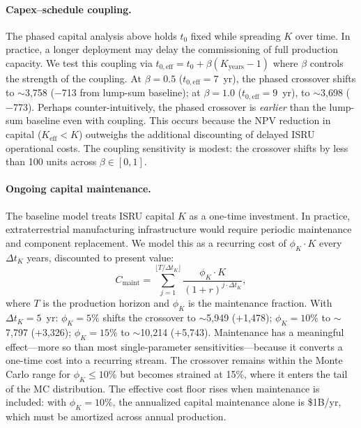 \documentclass[preprint,12pt]{elsarticle}
\begin{document}
\paragraph{Capex--schedule coupling.} The phased capital analysis above holds $t_0$ fixed while spreading $K$ over time. In practice, a longer deployment may delay the commissioning of full production capacity. We test this coupling via $t_{0,\mathrm{eff}} = t_0 + \beta(K_{\mathrm{years}} - 1)$ where $\beta$ controls the strength of the coupling. At $\beta = 0.5$ ($t_{0,\mathrm{eff}} = 7$~yr), the phased crossover shifts to $\sim$3{,}758 ($-$713 from lump-sum baseline); at $\beta = 1.0$ ($t_{0,\mathrm{eff}} = 9$~yr), to $\sim$3{,}698 ($-$773). Perhaps counter-intuitively, the phased crossover is \emph{earlier} than the lump-sum baseline even with coupling. This occurs because the NPV reduction in capital ($K_{\mathrm{eff}} < K$) outweighs the additional discounting of delayed ISRU operational costs. The coupling sensitivity is modest: the crossover shifts by less than 100 units across $\beta \in [0, 1]$.

\paragraph{Ongoing capital maintenance.} The baseline model treats ISRU capital $K$ as a one-time investment. In practice, extraterrestrial manufacturing infrastructure would require periodic maintenance and component replacement. We model this as a recurring cost of $\phi_K \cdot K$ every $\Delta t_K$ years, discounted to present value:
\begin{equation}
  C_{\mathrm{maint}} = \sum_{j=1}^{\lfloor T/\Delta t_K \rfloor} \frac{\phi_K \cdot K}{(1+r)^{j \cdot \Delta t_K}},
\end{equation}
where $T$ is the production horizon and $\phi_K$ is the maintenance fraction. With $\Delta t_K = 5$~yr: $\phi_K = 5\%$ shifts the crossover to $\sim$5{,}949 ($+$1{,}478); $\phi_K = 10\%$ to $\sim$7{,}797 ($+$3{,}326); $\phi_K = 15\%$ to $\sim$10{,}214 ($+$5{,}743). Maintenance has a meaningful effect---more so than most single-parameter sensitivities---because it converts a one-time cost into a recurring stream. The crossover remains within the Monte Carlo range for $\phi_K \leq 10\%$ but becomes strained at 15\%, where it enters the tail of the MC distribution. The effective cost floor rises when maintenance is included: with $\phi_K = 10\%$, the annualized capital maintenance alone is \$1B/yr, which must be amortized across annual production.
\end{document}

